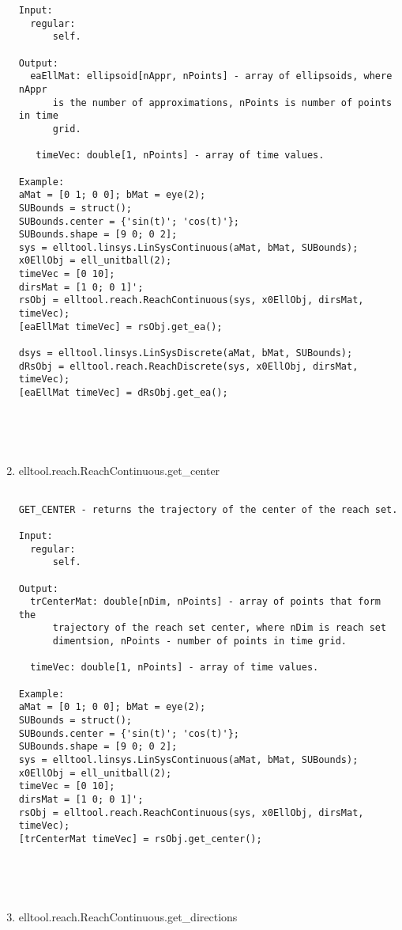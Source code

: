 \begin{enumerate}
\begin{lstlisting}
Input:
  regular:
      self.

Output:
  eaEllMat: ellipsoid[nAppr, nPoints] - array of ellipsoids, where nAppr
      is the number of approximations, nPoints is number of points in time
      grid.

   timeVec: double[1, nPoints] - array of time values.

Example:
aMat = [0 1; 0 0]; bMat = eye(2);
SUBounds = struct();
SUBounds.center = {'sin(t)'; 'cos(t)'};
SUBounds.shape = [9 0; 0 2];
sys = elltool.linsys.LinSysContinuous(aMat, bMat, SUBounds);
x0EllObj = ell_unitball(2);
timeVec = [0 10];
dirsMat = [1 0; 0 1]';
rsObj = elltool.reach.ReachContinuous(sys, x0EllObj, dirsMat, timeVec);
[eaEllMat timeVec] = rsObj.get_ea();

dsys = elltool.linsys.LinSysDiscrete(aMat, bMat, SUBounds);
dRsObj = elltool.reach.ReachDiscrete(sys, x0EllObj, dirsMat, timeVec);
[eaEllMat timeVec] = dRsObj.get_ea();





\end{lstlisting}
\fontfamily{\familydefault}
\selectfont
\item {elltool.reach.ReachContinuous.get\_center}
\selectfont
\begin{lstlisting}

GET_CENTER - returns the trajectory of the center of the reach set.

Input:
  regular:
      self.

Output:
  trCenterMat: double[nDim, nPoints] - array of points that form the
      trajectory of the reach set center, where nDim is reach set
      dimentsion, nPoints - number of points in time grid.

  timeVec: double[1, nPoints] - array of time values.

Example:
aMat = [0 1; 0 0]; bMat = eye(2);
SUBounds = struct();
SUBounds.center = {'sin(t)'; 'cos(t)'};
SUBounds.shape = [9 0; 0 2];
sys = elltool.linsys.LinSysContinuous(aMat, bMat, SUBounds);
x0EllObj = ell_unitball(2);
timeVec = [0 10];
dirsMat = [1 0; 0 1]';
rsObj = elltool.reach.ReachContinuous(sys, x0EllObj, dirsMat, timeVec);
[trCenterMat timeVec] = rsObj.get_center();





\end{lstlisting}
\fontfamily{\familydefault}
\selectfont
\item {elltool.reach.ReachContinuous.get\_directions}
\selectfont
\begin{lstlisting}


\end{lstlisting}
\end{enumerate}
